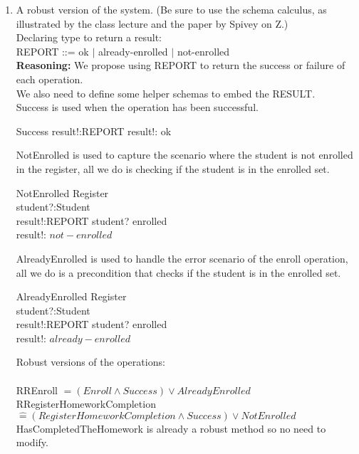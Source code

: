\documentclass{article}
\newcommand{\estimates}{\mathrel{\hat{=}}}
\begin{document}
\begin{enumerate}
\item A robust version of the system. (Be sure to use the schema calculus, as illustrated by the class lecture and the paper by Spivey on Z.) \\
  Declaring type to return a result: \\
REPORT ::= ok $\mid$ already-enrolled $\mid$ not-enrolled \\
\textbf{Reasoning:} We propose using REPORT to return the success or failure of each operation. \\
We also need to define some helper schemas to embed the RESULT. \\
Success is used when the operation has been successful. \\
  \begin{schema}{Success}
    result!:REPORT
  \where
    result!: ok
  \end{schema}
  NotEnrolled is used to capture the scenario where the student is not enrolled in the register, all we do is checking if the student is in the enrolled set. \\
  \begin{schema}{NotEnrolled}
    \Xi Register \\
    student?:Student \\
    result!:REPORT
    \where
    student? \notin enrolled \\
    result!: $not-enrolled$
  \end{schema}
  AlreadyEnrolled is used to handle the error scenario of the enroll operation, all we do is a precondition that checks if the student is in the enrolled set. \\
  \begin{schema}{AlreadyEnrolled}
    \Xi Register \\
    student?:Student \\
    result!:REPORT
    \where
    student? \in enrolled \\
    result!: $already-enrolled$
  \end{schema}
  Robust versions of the operations: \\
  \\
  RREnroll $\estimates (Enroll \land Success) \lor AlreadyEnrolled$\\
  RRegisterHomeworkCompletion $\estimates (RegisterHomeworkCompletion \land Success) \lor NotEnrolled $  \\
  HasCompletedTheHomework is already a robust method so no need to modify. \\
  \\
\end{enumerate}
\end{document}
